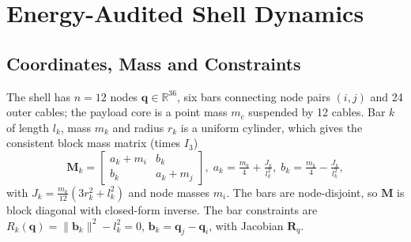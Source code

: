 \documentclass[letterpaper,10pt,conference]{IEEEtran}
\newcommand{\vect}[1]{\boldsymbol{#1}}
\newcommand{\R}{\mathbb{R}}
\begin{document}


\section{Energy-Audited Shell Dynamics}\label{sec:model}

\subsection{Coordinates, Mass and Constraints}
The shell has $n=12$ nodes $\vect q\in\R^{36}$, six bars connecting node
pairs $(i,j)$ and 24 outer cables; the payload core is a point mass
$m_c$ suspended by 12 cables. Bar $k$ of length $l_k$, mass $m_k$ and
radius $r_k$ is a uniform cylinder, which gives the consistent block
mass matrix (times $I_3$)
\begin{equation}
\vect M_k=\begin{bmatrix} a_k+m_i & b_k\\ b_k & a_k+m_j\end{bmatrix},\;
a_k=\tfrac{m_k}{4}+\tfrac{J_k}{l_k^2},\;
b_k=\tfrac{m_k}{4}-\tfrac{J_k}{l_k^2},
\end{equation}
with $J_k=\tfrac{m_k}{12}(3r_k^2+l_k^2)$ and node masses $m_i$. The bars
are node-disjoint, so $\vect M$ is block diagonal with closed-form
inverse. The bar constraints are $R_k(\vect q)=\|\vect b_k\|^2-l_k^2=0$,
$\vect b_k=\vect q_j-\vect q_i$, with Jacobian $\vect R_q$.
\end{document}
